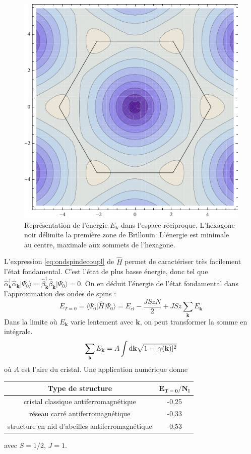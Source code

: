 \documentclass[a4paper, french]{report}
\newcommand{\bra}[1]{\ensuremath{\langle #1|}\xspace}
\newcommand{\h}{\ensuremath{\hat{H}}\xspace}
\newcommand{\fond}{\ensuremath{| \Psi_0 \rangle}\xspace}
\newcommand{\ond}{\ensuremath{\mathbf{k}\xspace}}
\newcommand{\gam}{\gamma(\ond{})}
\newcommand{\alcre}{\hat{\alpha}^\dagger_{\ond}}
\newcommand{\alan}{\hat{\alpha}_{\ond}}
\newcommand{\betcre}{\hat{\beta}^\dagger_{\ond}}
\newcommand{\betan}{\hat{\beta}_{\ond}}
\newcommand{\1}{\ensuremath{\ket{\om_1\bom_1}}\xspace}
\newcommand{\2}{\ensuremath{\ket{\om_2\bom_2}}\xspace}
\begin{document}
\begin{figure}[htp]
\centering
\includegraphics[scale=1.00]{vector_img/contour_energie_zone_brill.pdf}
\caption{Représentation de l'énergie $E_{\ond}$ dans l'espace réciproque. L'hexagone noir délimite la première zone de Brillouin. L'énergie est minimale au centre, maximale aux sommets de l'hexagone.}
\label{fig:energie}
\end{figure}

L'expression \ref{eq:ondspindecoupl} de \h permet de caractériser très facilement l'état fondamental. C'est l'état de plus basse énergie, donc tel que $\alcre\alan\fond=\betcre\betan\fond=0$. On en déduit l'énergie de l'état fondamental dans l'approximation des ondes de spins :
\begin{equation}
	E_{T=0}=\bra{\Psi_0}\h\fond=E_{cl}-\frac{JSzN}{2}+JSz\sum_{\ond}E_{\ond}
\end{equation}
Dans la limite où $E_{\ond}$ varie lentement avec $\ond$, on peut transformer la somme en intégrale.
\[
	\sum_{\ond}E_{\ond}=A\int \text{d\textbf{k}}\sqrt{1-|\gam|^2}
\]
où $A$ est l'aire du cristal. Une application numérique donne\\
\begin{tabular}{|c|c|}
\hline
	\textbf{Type de structure} & $\mathbf{E_{T=0}/N_l}$\\
\hline
	cristal classique antiferromagnétique & -0,25\\
\hline
	réseau carré antiferromagnétique  & -0,33\\
\hline
	structure en nid d'abeilles antiferromagnétique & -0,53\\
\hline
\end{tabular} avec $S=1/2$, $J=1$.
\end{document}
